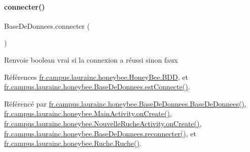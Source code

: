\paragraph{\texorpdfstring{connecter()}{connecter()}}
{\footnotesize\ttfamily Base\+De\+Donnees.\+connecter (\begin{DoxyParamCaption}{ }\end{DoxyParamCaption})}

\begin{DoxyReturn}{Renvoie}
boolean vrai si la connexion a réussi sinon faux 
\end{DoxyReturn}


Références \hyperlink{classfr_1_1campus_1_1laurainc_1_1honeybee_1_1_honey_bee_abfb4f6cc1c8bb793c37ccb8408abc51c}{fr.\+campus.\+laurainc.\+honeybee.\+Honey\+Bee.\+B\+DD}, et \hyperlink{classfr_1_1campus_1_1laurainc_1_1honeybee_1_1_base_de_donnees_a735f54c2c183a595c9a9a5ba947491f5}{fr.\+campus.\+laurainc.\+honeybee.\+Base\+De\+Donnees.\+est\+Connecte()}.



Référencé par \hyperlink{classfr_1_1campus_1_1laurainc_1_1honeybee_1_1_base_de_donnees_a2f6274017a47cc8f331c582f9a7ad6d1}{fr.\+campus.\+laurainc.\+honeybee.\+Base\+De\+Donnees.\+Base\+De\+Donnees()}, \hyperlink{classfr_1_1campus_1_1laurainc_1_1honeybee_1_1_main_activity_aba2e570bbba3bf1be8487068d9c6c2da}{fr.\+campus.\+laurainc.\+honeybee.\+Main\+Activity.\+on\+Create()}, \hyperlink{classfr_1_1campus_1_1laurainc_1_1honeybee_1_1_nouvelle_ruche_activity_ae97fec78fb0a2e1cc4610182bc71ea0d}{fr.\+campus.\+laurainc.\+honeybee.\+Nouvelle\+Ruche\+Activity.\+on\+Create()}, \hyperlink{classfr_1_1campus_1_1laurainc_1_1honeybee_1_1_base_de_donnees_a89357a1cc8a3648400df37a8bfe95958}{fr.\+campus.\+laurainc.\+honeybee.\+Base\+De\+Donnees.\+reconnecter()}, et \hyperlink{classfr_1_1campus_1_1laurainc_1_1honeybee_1_1_ruche_a56ec53516e4f94b4f5e42f083fa345db}{fr.\+campus.\+laurainc.\+honeybee.\+Ruche.\+Ruche()}.


